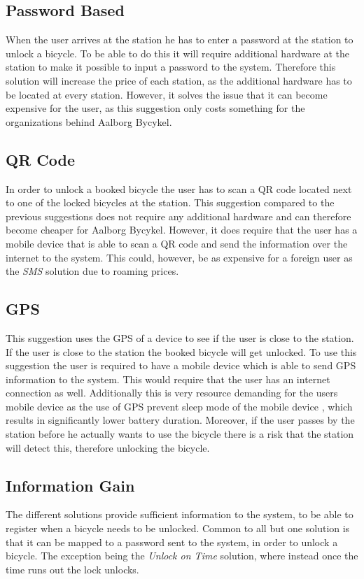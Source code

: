 \subsection{Password Based}
When the user arrives at the station he has to enter a password at the station to unlock a bicycle.
To be able to do this it will require additional hardware at the station to make it possible to input a password to the system.
Therefore this solution will increase the price of each station, as the additional hardware has to be located at every station.
However, it solves the issue that it can become expensive for the user, as this suggestion only costs something for the organizations behind Aalborg Bycykel.

\subsection{QR Code}
In order to unlock a booked bicycle the user has to scan a QR code located next to one of the locked bicycles at the station.
This suggestion compared to the previous suggestions does not require any additional hardware and can therefore become cheaper for Aalborg Bycykel.
However, it does require that the user has a mobile device that is able to scan a QR code and send the information over the internet to the system. This could, however, be as expensive for a foreign user as the \textit{SMS} solution due to roaming prices.

\subsection{GPS}
This suggestion uses the GPS of a device to see if the user is close to the station.
If the user is close to the station the booked bicycle will get unlocked.
To use this suggestion the user is required to have a mobile device which is able to send GPS information to the system.
This would require that the user has an internet connection as well.
Additionally this is very resource demanding for the users mobile device as the use of GPS prevent sleep mode of the mobile device \citep{misc:gpsbatteryusage}, which results in significantly lower battery duration.
Moreover, if the user passes by the station before he actually wants to use the bicycle there is a risk that the station will detect this, therefore unlocking the bicycle.

\subsection{Information Gain}
The different solutions provide sufficient information to the system, to be able to register when a bicycle needs to be unlocked.
Common to all but one solution is that it can be mapped to a password sent to the system, in order to unlock a bicycle.
The exception being the \textit{Unlock on Time} solution, where instead once the time runs out the lock unlocks.


